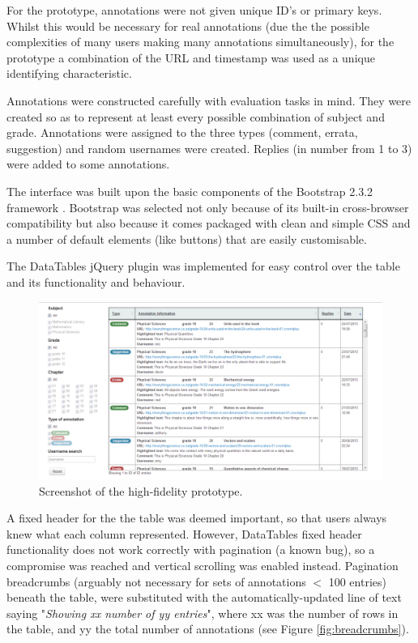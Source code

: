 For the prototype, annotations were not given unique ID's or primary keys. Whilst this would be necessary for real annotations (due the the possible complexities of many users making many annotations simultaneously), for the prototype a combination of the URL and timestamp was used as a unique identifying characteristic. 

Annotations were constructed carefully with evaluation tasks in mind. They were created so as to represent at least every possible combination of subject and grade. Annotations were assigned to the three types (comment, errata, suggestion) and random usernames were created. Replies (in number from 1 to 3) were added to some annotations.

The interface was built upon the basic components of the Bootstrap 2.3.2 framework \citep{Bootstrap}. Bootstrap was selected not only because of its built-in cross-browser compatibility but also because it comes packaged with clean and simple CSS and a number of default elements (like buttons) that are easily customisable. 

The DataTables jQuery plugin \citep{DataTables} was implemented for easy control over the table and its functionality and behaviour. 

\begin{figure}
    \centering
    \includegraphics[width=\textwidth]{Figures/V1/HiFi1mainview.PNG}
 \caption{Screenshot of the high-fidelity prototype.}
 \label{fig:HifiMain}
\end{figure}

A fixed header for the the table was deemed important, so that users always knew what each column represented. However, DataTables fixed header functionality does not work correctly with pagination (a known bug), so a compromise was reached and vertical scrolling was enabled instead. Pagination breadcrumbs (arguably not necessary for sets of annotations $<$ 100 entries) beneath the table, were substituted with the automatically-updated line of text saying "\textit{Showing xx number of yy entries}", where xx was the number of rows in the table, and yy the total number of annotations (see Figure \ref{fig:breadcrumbs}).

